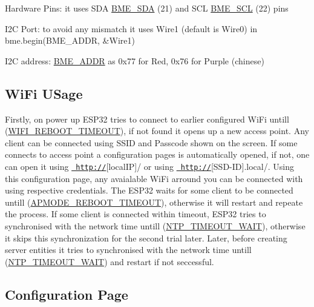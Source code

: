 \begin{DoxyItemize}
\item Hardware Pins\+: it uses S\+DA \mbox{\hyperlink{sensor_8h_ad9e594e426bce833af06dea308dbbf9a}{B\+M\+E\+\_\+\+S\+DA}} (21) and S\+CL \mbox{\hyperlink{sensor_8h_a5db75d8e5f3deda546603b949c520446}{B\+M\+E\+\_\+\+S\+CL}} (22) pins
\item I2C Port\+: to avoid any mismatch it uses Wire1 (default is Wire0) in bme.\+begin(\+B\+M\+E\+\_\+\+A\+D\+D\+R, \&\+Wire1)
\item I2C address\+: \mbox{\hyperlink{sensor_8h_a9f6149e98e70e1d5be5f0f33921cb7d7}{B\+M\+E\+\_\+\+A\+D\+DR}} as 0x77 for Red, 0x76 for Purple (chinese)
\end{DoxyItemize}\hypertarget{index_wifi}{}\subsection{Wi\+Fi U\+Sage}\label{index_wifi}
Firstly, on power up E\+S\+P32 tries to connect to earlier configured Wi\+Fi untill (\mbox{\hyperlink{my_auto_connect_8h_ab8e5b92436ed19ff04454974ca9b5140}{W\+I\+F\+I\+\_\+\+R\+E\+B\+O\+O\+T\+\_\+\+T\+I\+M\+E\+O\+UT}}), if not found it opens up a new access point. Any client can be connected using S\+S\+ID and Passcode shown on the screen. If some connects to access point a configuration pages is automatically opened, if not, one can open it using \href{http://}{\texttt{ http\+://}}\mbox{[}local\+IP\mbox{]}/ or using \href{http://}{\texttt{ http\+://}}\mbox{[}S\+S\+D-\/\+ID\mbox{]}.local/. Using this configuration page, any avaialable Wi\+Fi arround you can be connected with using respective credentials. The E\+S\+P32 waits for some client to be connected untill (\mbox{\hyperlink{main_8h_a8a1756fdd61bca61d188ce01ece876b9}{A\+P\+M\+O\+D\+E\+\_\+\+R\+E\+B\+O\+O\+T\+\_\+\+T\+I\+M\+E\+O\+UT}}), otherwise it will restart and repeate the process. If some client is connected within timeout, E\+S\+P32 tries to synchronised with the network time untill (\mbox{\hyperlink{main_8h_ad8124687637087b9096f96b838f93400}{N\+T\+P\+\_\+\+T\+I\+M\+E\+O\+U\+T\+\_\+\+W\+A\+IT}}), otherwise it skips this synchronization for the second trial later. Later, before creating server entities it tries to synchronised with the network time untill (\mbox{\hyperlink{main_8h_ad8124687637087b9096f96b838f93400}{N\+T\+P\+\_\+\+T\+I\+M\+E\+O\+U\+T\+\_\+\+W\+A\+IT}}) and restart if not seccessful.\hypertarget{index_configpage}{}\subsection{Configuration Page}\label{index_configpage}
